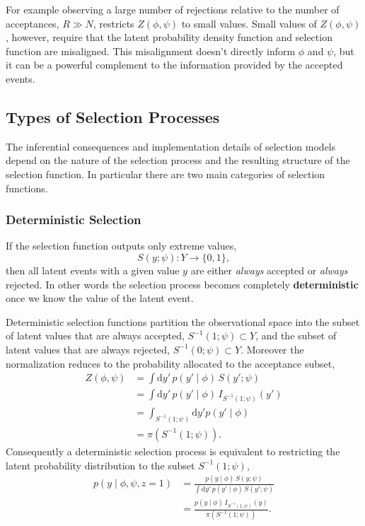 \documentclass[
  letterpaper,
  DIV=11,
  numbers=noendperiod]{scrartcl}
\begin{document}
For example observing a large number of rejections relative to the
number of acceptances, \(R \gg N\), restricts \(Z(\phi, \psi)\) to small
values. Small values of \(Z(\phi, \psi)\), however, require that the
latent probability density function and selection function are
misaligned. This misalignment doesn't directly inform \(\phi\) and
\(\psi\), but it can be a powerful complement to the information
provided by the accepted events.

\subsection{Types of Selection
Processes}\label{types-of-selection-processes}

The inferential consequences and implementation details of selection
models depend on the nature of the selection process and the resulting
structure of the selection function. In particular there are two main
categories of selection functions.

\subsubsection{Deterministic Selection}\label{deterministic-selection}

If the selection function outputs only extreme values, \[
S(y; \psi) : Y \rightarrow \{ 0, 1 \},
\] then all latent events with a given value \(y\) are either
\emph{always} accepted or \emph{always} rejected. In other words the
selection process becomes completely \textbf{deterministic} once we know
the value of the latent event.

Deterministic selection functions partition the observational space into
the subset of latent values that are always accepted,
\(S^{-1}(1; \psi) \subset Y\), and the subset of latent values that are
always rejected, \(S^{-1}(0; \psi) \subset Y\). Moreover the
normalization reduces to the probability allocated to the acceptance
subset, \begin{align*}
Z(\phi, \psi)
&=
\int \mathrm{d}y' \, p(y' \mid \phi) \, S(y'; \psi )
\\
&=
\int \mathrm{d}y' \, p(y' \mid \phi) \, I_{S^{-1}(1; \psi)}(y')
\\
&=
\int_{S^{-1}(1; \psi)} \mathrm{d}y' p(y' \mid \phi)
\\
&=
\pi ( S^{-1}(1; \psi) ).
\end{align*} Consequently a deterministic selection process is
equivalent to restricting the latent probability distribution to the
subset \(S^{-1}(1; \psi)\), \begin{align*}
p(y \mid \phi, \psi, z = 1)
&=
\frac{ p(y \mid \phi) \, S(y; \psi ) }
{ \int \mathrm{d}y' \, p(y' \mid \phi) \, S(y'; \psi ) }
\\
&=
\frac{ p(y \mid \phi) \, I_{S^{-1}(1; \psi)}(y) }
{ \pi ( S^{-1}(1; \psi) ) }.
\end{align*}
\end{document}
